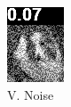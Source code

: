 \begin{figure}[H]
\begin{subfigure}[t]{0.15\textwidth}
    \includegraphics[width=\linewidth]{img/one-trial/loss_eval/L1/stimulus_1_value_noise_0.07_L1.png}
    \caption{V. Noise}
  \end{subfigure}
  \begin{subfigure}[t]{0.15\textwidth}
    \centering

\end{subfigure}
\end{figure}
